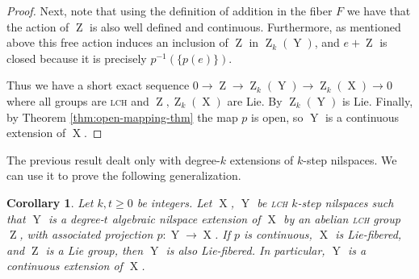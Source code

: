 \documentclass[a4paper,12pt,reqno]{amsart}
\newtheorem{corollary}[theorem]{Corollary}
\theoremstyle{definition}
\def\to{\rightarrow}
\DeclareMathOperator{\ab}{Z}
\DeclareMathOperator{\ns}{X}
\DeclareMathOperator{\nss}{Y}
\begin{document}
\begin{proof}
Next, note that using the definition of addition in the fiber $F$ we have that the action of $\ab$ is also well defined and continuous. Furthermore, as mentioned above this free action induces an inclusion of $\ab$ in $\ab_k(\nss)$, and $e+\ab$ is closed because it is precisely $p^{-1}(\{p(e)\})$.

Thus we have a short exact sequence $0\to \ab \to \ab_k(\nss) \to \ab_k(\ns)\to 0$ where all groups are \textsc{lch} and $\ab,\ab_k(\ns)$ are Lie. By \cite[Theorem 2.6]{Mosk} $\ab_k(\nss)$ is Lie. Finally, by Theorem \ref{thm:open-mapping-thm} the map $p$ is open, so $\nss$ is a continuous extension of $\ns$.
\end{proof}

The previous result dealt only with degree-$k$ extensions of $k$-step nilspaces. We can use it to prove the following generalization.

\begin{corollary}\label{cor:ext-of-lcfr-is-lcfr}
Let $k,t\ge 0$ be integers. Let $\ns$, $\nss$ be \textsc{lch} $k$-step nilspaces such that $\nss$ is a degree-$t$ algebraic nilspace extension of $\ns$ by an abelian \textsc{lch} group $\ab$, with associated projection $p:\nss\to \ns$. If $p$ is continuous, $\ns$ is Lie-fibered, and $\ab$ is a Lie group, then $\nss$ is also Lie-fibered. In particular, $\nss$ is a continuous extension of $\ns$.
\end{corollary}
\end{document}
